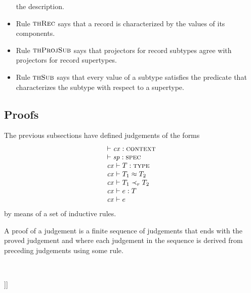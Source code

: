 \begin{itemize}
the description.
\item
Rule $\textsc{thRec}$ says that a record is characterized by the values of its
components.
\item
Rule $\textsc{thProjSub}$ says that projectors for record subtypes agree with
projectors for record supertypes.
\item
Rule $\textsc{thSub}$ says that every value of a subtype satisfies the predicate that
characterizes the subtype with respect to a supertype.
\end{itemize}

\subsection{Proofs}

The previous subsections have defined judgements of the forms
\[
\begin{array}{l}
\vdash\mathit{cx}:\textsc{context} \\
\vdash\mathit{sp}:\textsc{spec} \\
\mathit{cx}\vdash T:\textsc{type} \\
\mathit{cx}\vdash T_1\approx T_2 \\
\mathit{cx}\vdash T_1\prec_{r}T_2 \\
\mathit{cx}\vdash e:T \\
\mathit{cx}\vdash e
\end{array}
\]
by means of a set of inductive rules.

A proof of a judgement is a finite sequence of judgements that ends with the
proved judgement and where each judgement in the sequence is derived from
preceding judgements using some rule.

\

\noindent
[[[TO DO: Make sure that the rules for theorems are ``sufficient'', i.e.\ all
truths ``of interest'' are indeed theorems derivable from the rules. Even
though higher-order logic is notoriously incomplete, in practice theorem
provers like PVS and HOL are sufficient to prove desired properties of
formalized concepts without running into theoretical limitations. Perhaps the
requirement boils down to prove completeness with respect to so-called
``general models'' (cf.\ \cite{andrews}).]]]
